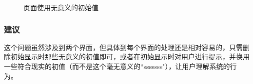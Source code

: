\begin{figure}[htbp]
	\setcounter{subfigure}{0}
	\centering

	\centering
	\caption{页面使用无意义的初始值}
    \label{问题5}
\end{figure}

\subsubsection{建议}
这个问题虽然涉及到两个界面，但具体到每个界面的处理还是相对容易的，只需删除初始显示时那些无意义的初值即可，或者在初始显示时对用户进行提示，并换用一些符合现实的初值（而不是这个毫无意义的``sssssss"），让用户理解系统的行为。
